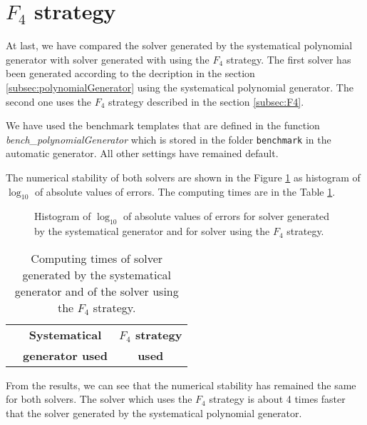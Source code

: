 \section{$F_4$ strategy}
At last, we have compared the solver generated by the systematical polynomial generator with solver generated with using the $F_4$ strategy. The first solver has been generated according to the decription in the section \ref{subsec:polynomialGenerator} using the systematical polynomial generator. The second one uses the $F_4$ strategy described in the section \ref{subsec:F4}.

We have used the benchmark templates that are defined in the function \textit{bench\_poly\-nomialGenerator} which is stored in the folder \texttt{benchmark} in the automatic generator. All other settings have remained default.

The numerical stability of both solvers are shown in the Figure \ref{graph:gen} as histogram of $\log_{10}$ of absolute values of errors. The computing times are in the Table \ref{tab:gen}.

\begin{figure}[ht]
  \centering
  \resizebox{0.95\textwidth}{!}{}
  \caption{Histogram of $\log_{10}$ of absolute values of errors for solver generated by the systematical generator and for solver using the $F_4$ strategy.}
  \label{graph:gen}
\end{figure}

\begin{table}[ht]
  \centering
  \begin{tabular}{|c||cc|}
    \hline
    & \textbf{Systematical}    & \textbf{$F_4$ strategy} \\
    &  \textbf{generator used} & \textbf{used} \\
    \hline\hline
    
    \hline
  \end{tabular}
  \caption{Computing times of solver generated by the systematical generator and of the solver using the $F_4$ strategy.}
  \label{tab:gen}
\end{table}

From the results, we can see that the numerical stability has remained the same for both solvers. The solver which uses the $F_4$ strategy is about 4 times faster that the solver generated by the systematical polynomial generator.
